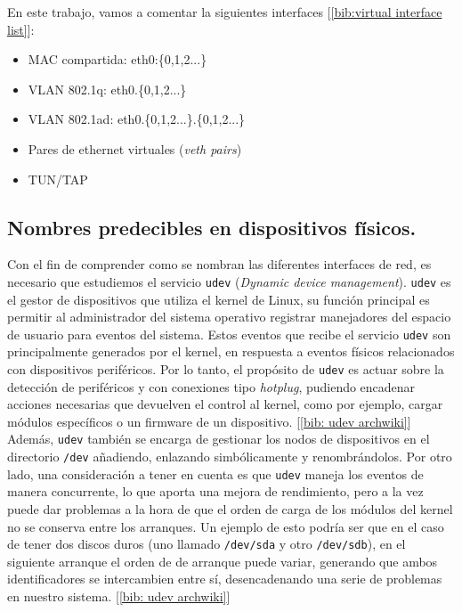 \documentclass[12pt]{article}
\begin{document}
	\par \noindent En este trabajo, vamos a comentar la siguientes interfaces [\ref{bib:virtual interface list}]:
	\begin{itemize}
		\item MAC compartida: eth0:\{0,1,2...\}
		\item VLAN 802.1q: eth0.\{0,1,2...\}
		\item VLAN 802.1ad: eth0.\{0,1,2...\}.\{0,1,2...\}
		\item Pares de ethernet virtuales (\textit{veth pairs})
		\item TUN/TAP
	\end{itemize}


	\subsection{Nombres predecibles en dispositivos físicos.}
	\noindent Con el fin de comprender como se nombran las diferentes interfaces de red, es necesario que estudiemos el servicio \texttt{udev} (\textit{Dynamic device management}). \texttt{udev} es el gestor de dispositivos que utiliza el kernel de Linux, su función principal es permitir al administrador del sistema operativo registrar manejadores del espacio de usuario para eventos del sistema. Estos eventos que recibe el servicio \texttt{udev} son principalmente generados por el kernel, en respuesta a eventos físicos relacionados con dispositivos periféricos. Por lo tanto, el propósito de \texttt{udev} es actuar sobre la detección de periféricos y con conexiones tipo \textit{hotplug}, pudiendo encadenar acciones necesarias que devuelven el control al kernel, como por ejemplo, cargar módulos específicos o un firmware de un dispositivo. [\ref{bib: udev archwiki}] \\
	
	\noindent Además, \texttt{udev} también se encarga de gestionar los nodos de dispositivos en el directorio \texttt{/dev} añadiendo, enlazando simbólicamente y renombrándolos. Por otro lado, una consideración a tener en cuenta es que \texttt{udev} maneja los eventos de manera concurrente, lo que aporta una mejora de rendimiento, pero a la vez puede dar problemas a la hora de que el orden de carga de los módulos del kernel no se conserva entre los arranques. Un ejemplo de esto podría ser que en el caso de tener dos discos duros (uno llamado \texttt{/dev/sda} y otro \texttt{/dev/sdb}), en el siguiente arranque el orden de de arranque puede variar, generando que ambos identificadores se intercambien entre sí, desencadenando una serie de problemas en nuestro sistema. [\ref{bib: udev archwiki}]\\
	
\end{document}
